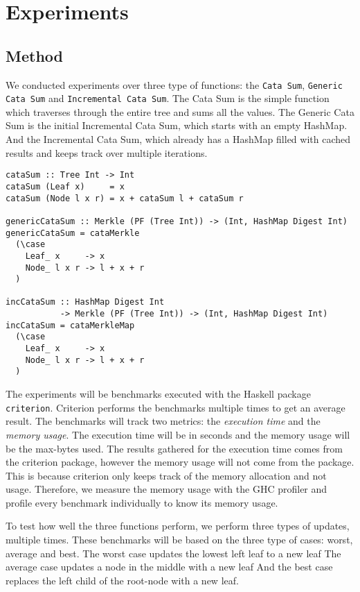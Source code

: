 \chapter{Experiments}

\section{Method}

We conducted experiments over three type of functions: the \texttt{Cata Sum}, \texttt{Generic Cata Sum} and \texttt{Incremental Cata Sum}. The Cata Sum is the simple function which traverses through the entire tree and sums all the values. The Generic Cata Sum is the initial Incremental Cata Sum, which starts with an empty HashMap. And the Incremental Cata Sum, which already has a HashMap filled with cached results and keeps track over multiple iterations.

\begin{verbatim}
cataSum :: Tree Int -> Int
cataSum (Leaf x)     = x
cataSum (Node l x r) = x + cataSum l + cataSum r

genericCataSum :: Merkle (PF (Tree Int)) -> (Int, HashMap Digest Int)
genericCataSum = cataMerkle
  (\case
    Leaf_ x     -> x
    Node_ l x r -> l + x + r
  )

incCataSum :: HashMap Digest Int 
           -> Merkle (PF (Tree Int)) -> (Int, HashMap Digest Int)
incCataSum = cataMerkleMap
  (\case
    Leaf_ x     -> x
    Node_ l x r -> l + x + r
  )
\end{verbatim}

The experiments will be benchmarks executed with the Haskell package \texttt{criterion}\cite{hackage2022criterion}. Criterion performs the benchmarks multiple times to get an average result. The benchmarks will track two metrics: the \textit{execution time} and the \textit{memory usage}. The execution time will be in seconds and the memory usage will be the max-bytes used. The results gathered for the execution time comes from the criterion package, however the memory usage will not come from the package. This is because criterion only keeps track of the memory allocation and not usage. Therefore, we measure the memory usage with the GHC profiler\cite*{ghc2022memoryprofiling} and profile every benchmark individually to know its memory usage.

To test how well the three functions perform, we perform three types of updates, multiple times. These benchmarks will be based on the three type of cases: worst, average and best. The worst case updates the lowest left leaf to a new leaf The average case updates a node in the middle with a new leaf And the best case replaces the left child of the root-node with a new leaf.

